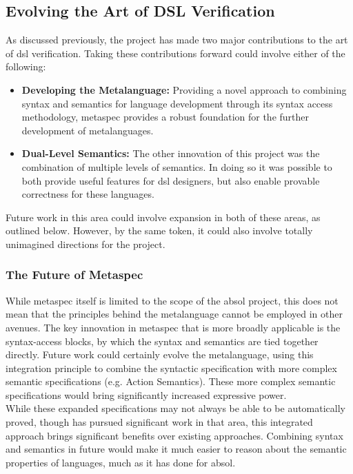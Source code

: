 \subsection{Evolving the Art of DSL Verification} %
\label{sub:evolving_the_art_of_dsl_verification}
As discussed previously, the project has made two major contributions to the art of \gls{dsl} verification.
Taking these contributions forward could involve either of the following:
\begin{itemize}
    \item \textbf{Developing the Metalanguage:} Providing a novel approach to combining syntax and semantics for language development through its syntax access methodology, \gls{metaspec} provides a robust foundation for the further development of metalanguages.
    \item \textbf{Dual-Level Semantics:} The other innovation of this project was the combination of multiple levels of semantics.
    In doing so it was possible to both provide useful features for \gls{dsl} designers, but also enable provable correctness for these languages.
\end{itemize}

Future work in this area could involve expansion in both of these areas, as outlined below.
However, by the same token, it could also involve totally unimagined directions for the project.

\subsubsection{The Future of Metaspec} %
\label{ssub:the_future_of_metaspec}
While \gls{metaspec} itself is limited to the scope of the \gls{absol} project, this does not mean that the principles behind the metalanguage cannot be employed in other avenues. 
The key innovation in metaspec that is more broadly applicable is the syntax-access blocks, by which the syntax and semantics are tied together directly. 
Future work could certainly evolve the metalanguage, using this integration principle to combine the syntactic specification with more complex semantic specifications (e.g. Action Semantics).
These more complex semantic specifications would bring significantly increased expressive power.\\

While these expanded specifications may not always be able to be automatically proved, though \citet{Mosses:2009:CS:1596486.1596489} has pursued significant work in that area, this integrated approach brings significant benefits over existing approaches.
Combining syntax and semantics in future would make it much easier to reason about the semantic properties of languages, much as it has done for \gls{absol}.

